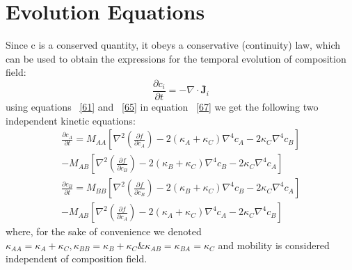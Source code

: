 \documentclass[12pt]{iiscthes}
\theoremstyle{definition}
\theoremstyle{definition}
\theoremstyle{remark}
\begin{document}
\section{Evolution Equations}
Since c is a conserved quantity, it obeys a conservative (continuity) law, which can be used to obtain the expressions for the temporal evolution of composition field:
\begin{equation}\label{67}
\frac{\partial c_i}{\partial t}= - \nabla\cdot\mathbf{\bar J}_i
\end{equation}
using equations ~\ref{61} and ~\ref{65} in equation ~\ref{67} we get the following two independent kinetic equations:
\begin{eqnarray}\label{e1}
\frac{\partial c_A}{\partial t}= M_{AA}\left[\nabla^2 \left(\frac{\partial f}{\partial c_A}\right)-2\left(\kappa_A+\kappa_C\right)\nabla^4 c_A - 2\kappa_C\nabla^4 c_B\right]\nonumber\\
-M_{AB}\left[\nabla^2 \left(\frac{\partial f}{\partial c_B}\right)-2\left(\kappa_B+\kappa_C\right)\nabla^4 c_B-2\kappa_C\nabla^4 c_A\right]
\end{eqnarray}
\begin{eqnarray}\label{e2}
\frac{\partial c_B}{\partial t}= M_{BB}\left[\nabla^2 \left(\frac{\partial f}{\partial c_B}\right)-2\left(\kappa_B+\kappa_C\right)\nabla^4 c_B - 2\kappa_C\nabla^4 c_A\right]\nonumber\\
-M_{AB}\left[\nabla^2 \left(\frac{\partial f}{\partial c_A}\right)-2\left(\kappa_A+\kappa_C\right)\nabla^4 c_A-2\kappa_C\nabla^4 c_B\right]
\end{eqnarray}
where, for the sake of convenience we denoted $ \kappa_{AA}=\kappa_A+\kappa_C ,\kappa_{BB}=\kappa_B+\kappa_C \& \kappa_{AB}=\kappa_{BA}=\kappa_C $ and mobility is considered independent of composition field.
\end{document}
